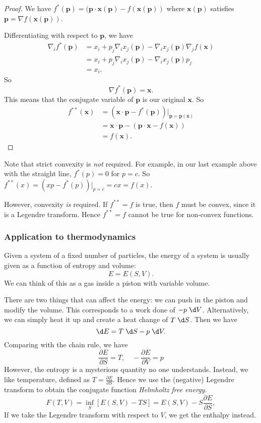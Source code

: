 \documentclass[a4paper]{article}
\begin{document}
\begin{proof}
  We have $f^*(\mathbf{p}) = (\mathbf{p}\cdot\mathbf{x}(\mathbf{p}) - f(\mathbf{x}(\mathbf{p}))$ where $\mathbf{x}(\mathbf{p})$ satisfies $\mathbf{p} = \nabla f(\mathbf{x}(\mathbf{p}))$.

  Differentiating with respect to $\mathbf{p}$, we have
  \begin{align*}
    \nabla_i f^*(\mathbf{p}) &= x_i + p_j \nabla_i x_j (\mathbf{p}) - \nabla_i x_j(\mathbf{p}) \nabla_j f(\mathbf{x})\\
    &= x_i + p_j \nabla_i x_j(\mathbf{p}) - \nabla_i x_j(\mathbf{p}) p_j\\
    &= x_i.
  \end{align*}
  So
  \[
    \nabla f^*(\mathbf{p}) = \mathbf{x}.
  \]
  This means that the conjugate variable of $\mathbf{p}$ is our original $\mathbf{x}$. So
  \begin{align*}
    f^{**}(\mathbf{x}) &= (\mathbf{x} \cdot \mathbf{p} - f^*(\mathbf{p}))|_{\mathbf{p} = \mathbf{p}(\mathbf{x})}\\
    &= \mathbf{x}\cdot \mathbf{p} - (\mathbf{p}\cdot \mathbf{x} - f(\mathbf{x}))\\
    &= f(\mathbf{x}).
  \end{align*}
\end{proof}
Note that strict convexity is \emph{not} required. For example, in our last example above with the straight line, $f^*(p) = 0$ for $p = c$. So $f^{**}(x) = (xp - f^*(p))|_{p = c} = cx = f(x)$.

However, convexity \emph{is} required. If $f^{**} = f$ is true, then $f$ must be convex, since it is a Legendre transform. Hence $f^{**} = f$ cannot be true for non-convex functions.

\subsubsection{Application to thermodynamics}
Given a system of a fixed number of particles, the energy of a system is usually given as a function of entropy and volume:
\[
  E = E(S, V).
\]
We can think of this as a gas inside a piston with variable volume.

There are two things that can affect the energy: we can push in the piston and modify the volume. This corresponds to a work done of $-p\;\d V$. Alternatively, we can simply heat it up and create a heat change of $T\;\d S$. Then we have
\[
  \d E = T\;\d S - p\;\d V.
\]
Comparing with the chain rule, we have
\[
  \frac{\partial E}{\partial S} = T,\quad -\frac{\partial E}{\partial V} = p
\]
However, the entropy is a mysterious quantity no one understands. Instead, we like temperature, defined as $T = \frac{\partial E}{\partial S}$. Hence we use the (negative) Legendre transform to obtain the conjugate function \emph{Helmholtz free energy}.
\[
  F(T, V) = \inf_S [E(S, V) - TS] = E(S, V) - S\frac{\partial E}{\partial S},
\]
If we take the Legendre transform with respect to $V$, we get the enthalpy instead.
\end{document}
